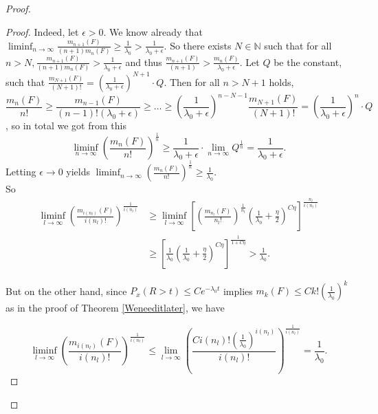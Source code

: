 \documentclass[12pt,a4paper]{scrartcl}
\numberwithin{equation}{section}
\newcommand{\N}{\mathbb{N}} %
\begin{document}
\begin{proof}
\begin{proof}
Indeed, let $ \epsilon > 0 $. We know already that $\liminf_{n \to \infty} \frac{m_{n+1}\left(F\right)}{\left(n+1\right) m_n\left(F\right)} \geq \frac{1}{\lambda_0} > \frac{1}{\lambda_0 + \epsilon}.$ So there exists $N \in \N$ such that for all $ n > N , \frac{m_{n+1}\left(F\right)}{\left(n+1\right) m_n\left(F\right)} > \frac{1}{\lambda_0 + \epsilon}$ and thus $\frac{m_{n+1}\left(F\right)}{\left(n+1\right) } > \frac{m_n\left(F\right)}{\lambda_0+\epsilon}$.  Let $ Q $ be the constant, such that $ \frac{m_{N+1}\left(F\right)}{\left(N+1\right)! } = \left(\frac{1}{\lambda_0+\epsilon}\right)^{N+1} \cdot Q.$ Then for all $ n > N+1 $ holds,
$$ \frac{m_n\left(F\right)}{n!} \geq \frac{m_{n-1}\left(F\right)}{\left(n-1\right)! \left(\lambda_0+\epsilon\right)}\geq \ldots \geq \left(\frac{1}{\lambda_0+\epsilon}\right)^{n-N-1}\frac{m_{N+1}\left(F\right)}{\left(N+1\right)!} = \left(\frac{1}{\lambda_0+\epsilon}\right)^{n} \cdot Q $$, so in total we got from this
$$ \liminf_{n \to \infty} \left(\frac{m_n\left(F\right)}{n!}\right)^{\frac{1}{n}} \geq \frac{1}{\lambda_0+\epsilon} \cdot \lim_{n \to \infty} Q^{\frac{1}{n}} = \frac{1}{\lambda_0+\epsilon}. $$
Letting $ \epsilon \to 0 $ yields $ \liminf_{n \to \infty} \left(\frac{m_n\left(F\right)}{n!}\right)^{\frac{1}{n}} \geq \frac{1}{\lambda_0}$.\\[2ex]

So
\begin{align*}
\liminf_{l \to \infty} \left(\frac{m_{i\left(n_l\right)}\left(F\right)}{i\left(n_l\right)!} \right)^{\frac{1}{i\left(n_l\right)}} &\geq \liminf_{l \to \infty} \left[ \left(\frac{m_{n_l}\left(F\right)}{n_l!}\right)^{\frac{1}{n_l}} \left(\frac{1}{\lambda_0} + \frac{\eta}{2}\right)^{C\eta}\right]^{\frac{n_l}{i\left(n_l\right)}} \\
&\geq \left[\frac{1}{\lambda_0} \left(\frac{1}{\lambda_0} + \frac{\eta}{2}\right)^{C\eta} \right]^{\frac{1}{1+C\eta}} > \frac{1}{\lambda_0}.
\end{align*}

But on the other hand, since $ P_x\left(R > t\right) \leq Ce^{-\lambda_0 t} $ implies $ m_k\left(F\right) \leq C k! \left(\frac{1}{\lambda_0}\right)^k $ as in the proof of Theorem \ref{Weneeditlater}, we have

$$ \liminf_{l \to \infty} \left(\frac{m_{i\left(n_l\right)}\left(F\right)}{i\left(n_l\right)!} \right)^{\frac{1}{i\left(n_l\right)}} \leq \lim_{l \to \infty} \left(\frac{C i\left(n_l\right)! \left(\frac{1}{\lambda_0}\right)^{i\left(n_l\right)}}{i\left(n_l\right)!}\right)^{\frac{1}{i\left(n_l\right)}} = \frac{1}{\lambda_0}.$$


\end{proof}
\end{proof}
\end{document}
